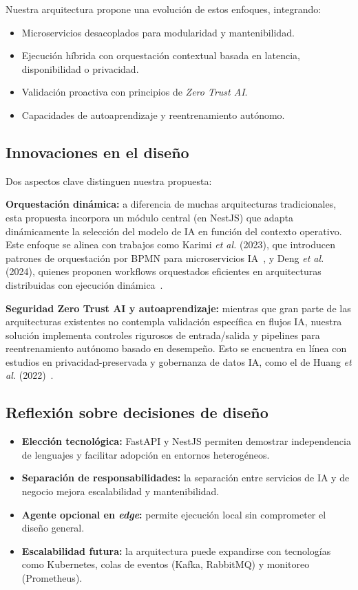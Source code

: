\documentclass[a4paper]{llncs}
\begin{document}
Nuestra arquitectura propone una evolución de estos enfoques, integrando:

\begin{itemize}
    \item Microservicios desacoplados para modularidad y mantenibilidad.
    \item Ejecución híbrida con orquestación contextual basada en latencia, disponibilidad o privacidad.
    \item Validación proactiva con principios de \textit{Zero Trust AI}.
    \item Capacidades de autoaprendizaje y reentrenamiento autónomo.
\end{itemize}

\subsection{Innovaciones en el diseño}

Dos aspectos clave distinguen nuestra propuesta:

\textbf{Orquestación dinámica:} a diferencia de muchas arquitecturas tradicionales, esta propuesta incorpora un módulo central (en NestJS) que adapta dinámicamente la selección del modelo de IA en función del contexto operativo. Este enfoque se alinea con trabajos como Karimi \textit{et al.} (2023), que introducen patrones de orquestación por BPMN para microservicios IA~\cite{karimi2023dynamic}, y Deng \textit{et al.} (2024), quienes proponen workflows orquestados eficientes en arquitecturas distribuidas con ejecución dinámica~\cite{deng2024orchestrated}.

\textbf{Seguridad Zero Trust AI y autoaprendizaje:} mientras que gran parte de las arquitecturas existentes no contempla validación específica en flujos IA, nuestra solución implementa controles rigurosos de entrada/salida y pipelines para reentrenamiento autónomo basado en desempeño. Esto se encuentra en línea con estudios en privacidad-preservada y gobernanza de datos IA, como el de Huang \textit{et al.} (2022)~\cite{huang2022privacy}.

\subsection{Reflexión sobre decisiones de diseño}

\begin{itemize}
  \item \textbf{Elección tecnológica:} FastAPI y NestJS permiten demostrar independencia de lenguajes y facilitar adopción en entornos heterogéneos.
  \item \textbf{Separación de responsabilidades:} la separación entre servicios de IA y de negocio mejora escalabilidad y mantenibilidad.
  \item \textbf{Agente opcional en \textit{edge}:} permite ejecución local sin comprometer el diseño general.
  \item \textbf{Escalabilidad futura:} la arquitectura puede expandirse con tecnologías como Kubernetes, colas de eventos (Kafka, RabbitMQ) y monitoreo (Prometheus).
\end{itemize}
\end{document}
